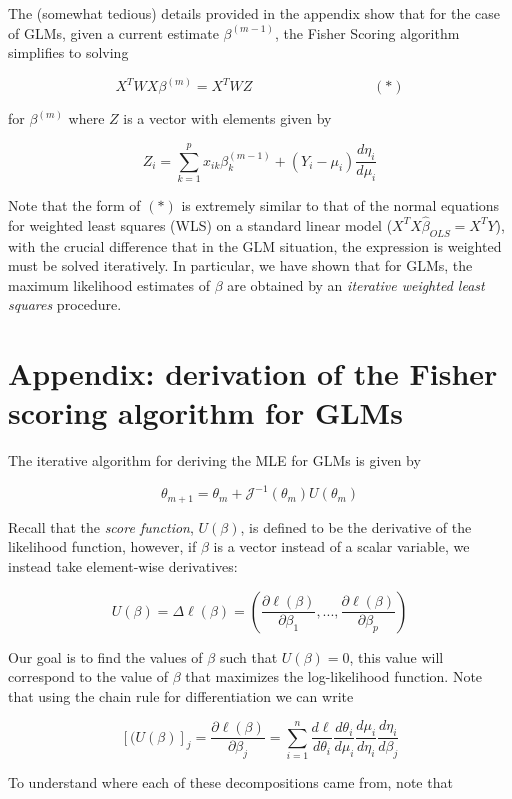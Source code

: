 The (somewhat tedious) details provided in the appendix show that for the case of GLMs, given a current estimate $\beta^{(m-1)}$, the Fisher Scoring algorithm simplifies to solving

$$X^TWX \beta^{(m)} = X^TWZ ~~~~~~~~~~~~~~~~~~~~~~~~~~~~~~~~~~~~~~~ (*)$$

for $\beta^{(m)}$ where $Z$ is a vector with elements given by

$$Z_i = \sum_{k=1}^px_{ik}\beta_k^{(m-1)} + (Y_i - \mu_i) \frac{d\eta_i}{d\mu_i}$$

Note that the form of $(*)$ is extremely similar to that of the normal equations for weighted least squares (WLS) on a standard linear model ($X^TX \hat{\beta}_{OLS} = X^TY$), with the crucial difference that in the GLM situation, the expression is weighted must be solved iteratively. In particular, we have shown that for GLMs, the maximum likelihood estimates of $\beta$ are obtained by an \textit{iterative weighted least squares} procedure.



\section{Appendix: derivation of the Fisher scoring algorithm for GLMs}

The iterative algorithm for deriving the MLE for GLMs is given by

$$\theta_{m + 1} = \theta_m + \mathcal{J}^{-1}(\theta_m)U(\theta_m)$$

Recall that the \textit{score function}, $U(\beta)$, is defined to be the derivative of the likelihood function, however, if $\beta$ is a vector instead of a scalar variable, we instead take element-wise derivatives:

$$U(\beta) = \Delta \ell(\beta) = \left(\frac{\partial \ell(\beta)}{\partial \beta_1},... , \frac{\partial \ell(\beta)}{\partial \beta_p}\right)$$

Our goal is to find the values of $\beta$ such that $U(\beta) = 0$, this value will correspond to the value of $\beta$ that maximizes the log-likelihood function. Note that using the chain rule for differentiation we can write

$$[(U(\beta)]_j = \frac{\partial \ell(\beta)}{\partial \beta_j} = \sum_{i=1}^n \frac{d \ell}{d \theta_i} \frac{d\theta_i}{d\mu_i} \frac{d\mu_i}{d\eta_i} \frac{d\eta_i}{d\beta_j}$$


To understand where each of these decompositions came from, note that



